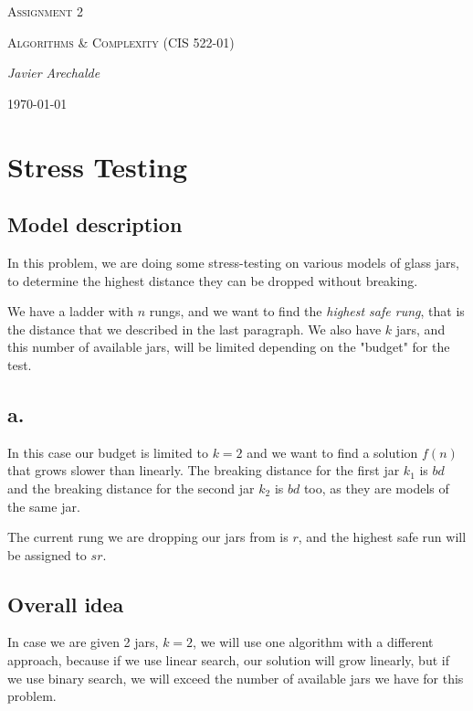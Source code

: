 \documentclass{article}
\begin{document}
\begin{titlepage}
	\centering
	{\scshape\LARGE Assignment 2\par}
	\vspace{1cm}
	{\scshape\Large Algorithms \& Complexity (CIS 522-01)\par}
	\vspace{1.5cm}
	{\Large\itshape Javier Arechalde\par}
	\vfill
	{\large \today\par}
\end{titlepage}

\section*{Stress Testing}

\subsection*{Model description}

In this problem, we are doing some stress-testing on various models of glass jars, to determine the highest distance they can be dropped without breaking. 

We have a ladder with $n$ rungs, and we want to find the \textit{highest safe rung}, that is the distance that we described in the last paragraph. We also have $k$ jars, and this number of available jars, will be limited depending on the "budget" for the test.

\subsection*{a.}

In this case our budget is limited to $k = 2$ and we want to find a solution $f(n)$ that grows slower than linearly. The breaking distance for the first jar $k_1$ is $bd$ and the breaking distance for the second jar $k_2$ is $bd$ too, as they are models of the same jar.

The current rung we are dropping our jars from is $r$, and the highest safe run will be assigned to $sr$.

\subsection*{Overall idea}

In case we are given 2 jars, $k = 2$, we will use one algorithm with a different approach, because if we use linear search, our solution will grow linearly, but if we use binary search, we will exceed the number of available jars we have for this problem.
\end{document}
